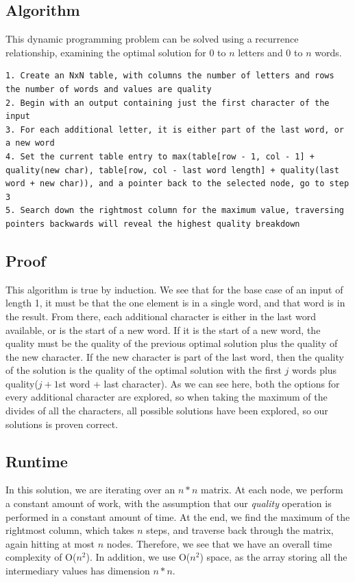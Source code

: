 \documentclass[titlepage]{article}
\numberwithin{equation}{subsection}
\begin{document}
\subsection{Algorithm}
This dynamic programming problem can be solved using a recurrence relationship, examining the optimal solution
for 0 to $n$ letters and 0 to $n$ words.
\begin{lstlisting}
1. Create an NxN table, with columns the number of letters and rows the number of words and values are quality
2. Begin with an output containing just the first character of the input
3. For each additional letter, it is either part of the last word, or a new word
4. Set the current table entry to max(table[row - 1, col - 1] + quality(new char), table[row, col - last word length] + quality(last word + new char)), and a pointer back to the selected node, go to step 3
5. Search down the rightmost column for the maximum value, traversing pointers backwards will reveal the highest quality breakdown
\end{lstlisting}
\subsection{Proof}
This algorithm is true by induction. We see that for the base case of an input of length 1, it must be that the
one element is in a single word, and that word is in the result. From there, each additional character is either in
the last word available, or is the start of a new word. If it is the start of a new word, the quality must be
the quality of the previous optimal solution plus the quality of the new character. If the new character is
part of the last word, then the quality of the solution is the quality of the optimal solution with the first $j$
words plus quality($j+1$st word + last character). As we can see here, both the options for every additional character
are explored, so when taking the maximum of the divides of all the characters, all possible solutions have been explored,
so our solutions is proven correct.
\subsection{Runtime}
In this solution, we are iterating over an $n*n$ matrix. At each node, we perform a constant amount of work, with the
assumption that our \textit{quality} operation is performed in a constant amount of time. At the end, we find the maximum
of the rightmost column, which takes $n$ steps, and traverse back through the matrix, again hitting at most $n$ nodes.
Therefore, we see that we have an overall time complexity of O($n^2$). In addition, we use O($n^2$) space, as the
array storing all the intermediary values has dimension $n*n$.
\end{document}
